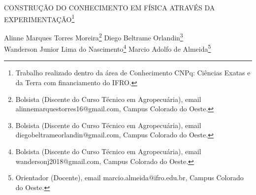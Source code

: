 \documentclass[article,12pt,onesidea,4paper,english,brazil]{abntex2}
\begin{document}
	
	
	\frenchspacing 
	
	\begin{center}
		\LARGE CONSTRUÇÃO DO CONHECIMENTO EM FÍSICA ATRAVÉS DA
		EXPERIMENTAÇÃO\footnote{Trabalho realizado dentro da área de Conhecimento CNPq: Ciências Exatas e da Terra com
			financiamento do IFRO.}
		
		\normalsize
		Alinne Marques Torres Moreira\footnote{Bolsista (Discente do Curso Técnico em Agropecuária), email alinnemarquestorres16@gmail.com,
			Campus Colorado do Oeste.} 
	Diego Beltrame Orlandin\footnote{Bolsista (Discente do Curso Técnico em Agropecuária), email diegobeltrameorlandin@gmail.com,
		Campus Colorado do Oeste.} \\
		Wanderson Junior Lima do Nascimento\footnote{Bolsista (Discente do Curso Técnico em Agropecuária), email wandersonj2018@gmail.com, Campus Colorado do Oeste.} 
	Marcio Adolfo de Almeida\footnote{Orientador (Docente), email marcio.almeida@ifro.edu.br, Campus Colorado do Oeste.} 
	\end{center}
	
\end{document}
